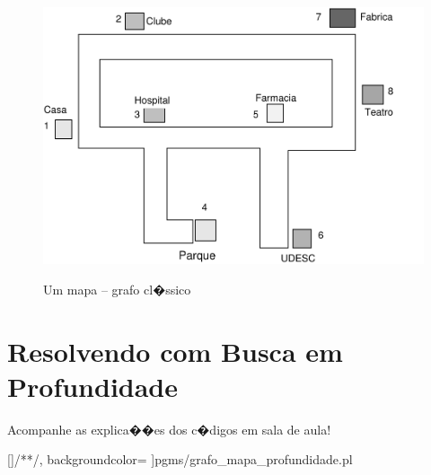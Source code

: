 \documentclass[final,a4paper]{article}
\begin{document}
\begin{figure}[!htb]
\centering
\includegraphics[scale=0.6]{figuras/grafo_mapa.pdf}
\label{fig_grafo_mapa}
\caption{Um mapa -- grafo cl�ssico}
\end{figure}


\section{Resolvendo com  Busca em Profundidade}

 Acompanhe as explica��es dos c�digos em sala de aula!

[\color{blue}]{/*}{*/}, %
              backgroundcolor=\color{yellow}  %
		 ]{pgms/grafo_mapa_profundidade.pl}
\end{document}
